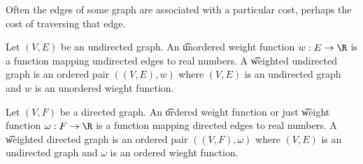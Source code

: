 

Often the edges of some graph are associated with a particular cost, perhaps the cost of traversing that edge.


Let $(V, E)$ be an undirected graph.
An \t{unordered weight function} $w: E \to \R$ is a function mapping undirected edges to real numbers.
A \t{weighted undirected graph} is an ordered pair $((V, E),w)$ where $(V, E)$ is an undirected graph and $w$ is an unordered wieght function.

Let $(V, F)$ be a directed graph.
An \t{ordered weight function} or just \t{weight function} $\omega: F \to \R$ is a function mapping directed edges to real numbers.
A \t{weighted directed graph} is an ordered pair $((V, F),\omega)$ where $(V, E)$ is an undirected graph and $\omega$ is an ordered wieght function.

\blankpage

